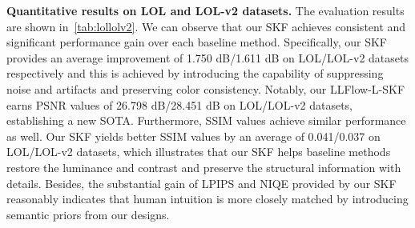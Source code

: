 \documentclass[10pt,twocolumn,letterpaper]{article}
\begin{document}
\vspace{-0.1cm}
\textbf{Quantitative results on LOL and LOL-v2 datasets.} The evaluation results are shown in~\cref{tab:lollolv2}. We can observe that our SKF achieves consistent and significant performance gain over each baseline method. Specifically, our SKF provides an average improvement of 1.750 dB/1.611 dB on LOL/LOL-v2 datasets respectively and this is achieved by introducing the capability of suppressing noise and artifacts and preserving color consistency. Notably, our LLFlow-L-SKF earns PSNR values of 26.798 dB/28.451 dB on LOL/LOL-v2 datasets, establishing a new SOTA. Furthermore, SSIM values achieve similar performance as well. Our SKF yields better SSIM values by an average of 0.041/0.037 on LOL/LOL-v2 datasets, which illustrates that our SKF helps baseline methods restore the luminance and contrast and preserve the structural information with details. Besides, the substantial gain of LPIPS and NIQE provided by our SKF reasonably indicates that human intuition is more closely matched by introducing semantic priors from our designs. 
\end{document}
